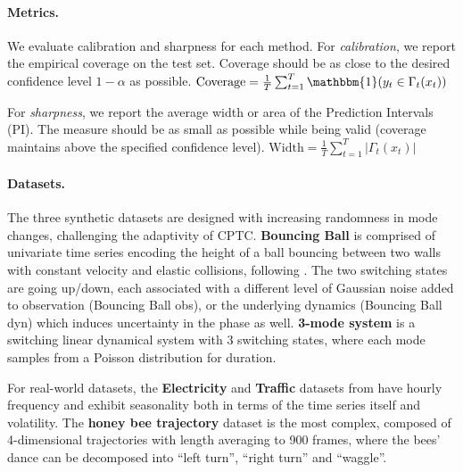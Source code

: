 \paragraph{Metrics.}
We evaluate calibration and sharpness for each method. For \textit{calibration}, we report the empirical coverage on the test set. Coverage should be as close to the desired confidence level $1-\alpha$ as possible.
$
 \mathrm{Coverage}= \frac{1}{T} \sum_{t=1}^T \mathbbm{1} (y_t \in \Gamma_t (x_t))
$
   
For \textit{sharpness}, we report the average width or area of the Prediction Intervals (PI). The measure should be as small as possible while being valid (coverage maintains above the specified confidence level). 
$
\mathrm{Width} = \frac{1}{T} \sum_{t=1}^T  | \Gamma_t(x_t)|
$


\vspace{-0.5em}
\paragraph{Datasets.} The three synthetic datasets are designed with increasing randomness in mode changes, challenging the adaptivity of CPTC. \textbf{Bouncing Ball} is comprised of univariate time series encoding the height of a ball bouncing between two walls with constant velocity and elastic collisions, following \cite{dong2020collapsed, ansari2021deep}. The two switching states are going up/down, each associated with a different level of Gaussian noise added to observation (Bouncing Ball obs), or the underlying dynamics (Bouncing Ball dyn) which induces uncertainty in the phase as well.  
\textbf{3-mode system} is a switching linear dynamical system with 3 switching states, where each mode samples from a Poisson distribution for duration. 

For real-world datasets, the \textbf{Electricity} and \textbf{Traffic} datasets from \citep{Dua2017UCI} have hourly frequency and exhibit seasonality both in terms of the time series itself and volatility. The \textbf{honey bee trajectory} dataset  \citep{oh2008learning} is the most complex, composed of 4-dimensional trajectories with length averaging to 900 frames, where the bees' dance can be decomposed into ``left turn”, ``right turn” and ``waggle”.


